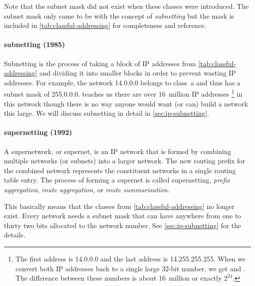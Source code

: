 Note that the subnet mask did not exist when these classes were introduced.
The subnet mask only came to be with the concept of \emph{subnetting} but the mask is included in \cref{tab:classful-addressing} for completeness and reference.

\paragraph{subnetting (1985)}
Subnetting is the process of taking a block of \acs{IP} addresses from \vref{tab:classful-addressing} and dividing it into smaller blocks in order to prevent wasting \acs{IP} addresses.
For example, the network 14.0.0.0 belongs to class~a and thus has a subnet mask of 255.0.0.0.
 teaches us there are over 16~million \acs{IP} addresses%
   \footnote{%
      The first address is 14.0.0.0 and the last address is 14.255.255.255.
      When we convert both \acs{IP} addresses back to a single large 32-bit number, we get  and .
      The difference between these numbers is about 16~million or exactly $2^24$.
   }
in this network though there is no way anyone would want (or can) build a network this large.
We will discuss subnetting in detail in \vref{sec:ip-subnetting}.

\paragraph{supernetting (1992)}
A supernetwork, or supernet, is an \acs{IP} network that is formed by combining multiple networks (or subnets) into a larger network.
The new routing prefix for the combined network represents the constituent networks in a single routing table entry.
The process of forming a supernet is called supernetting, \emph{prefix aggregation}, \emph{route aggregation}, or \emph{route summarisation}.

This basically means that the classes from \vref{tab:classful-addressing} no longer exist.
Every network needs a subnet mask that can have anywhere from one to thirty two bits allocated to the network number.
See \vref{sec:ip-subnetting} for the details.

